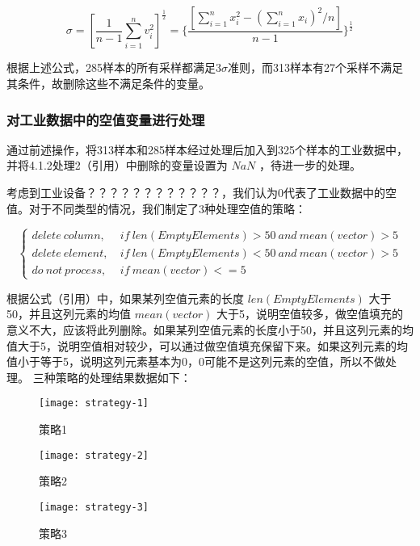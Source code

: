 \documentclass[bwprint]{gmcmthesis}
\begin{document}
\begin{equation}\label{eq:3sigma}
	\sigma = [\frac{1}{n-1}\sum_{i=1}^{n}v_i^2]^{\frac{1}{2}} = \{\frac{[\sum^n_{i=1}x_i^2 - (\sum^n_{i=1}x_i)^2/n]}{n-1}\}^{\frac{1}{2}}
\end{equation}

根据上述公式，285样本的所有采样都满足3$\sigma$准则，而313样本有27个采样不满足其条件，故删除这些不满足条件的变量。


\FloatBarrier
\subsubsection{对工业数据中的空值变量进行处理}

通过前述操作，将313样本和285样本经过处理后加入到325个样本的工业数据中，并将4.1.2处理2（引用）中删除的变量设置为 $NaN$ ，待进一步的处理。

考虑到工业设备？？？？？？？？？？？？，我们认为0代表了工业数据中的空值。对于不同类型的情况，我们制定了3种处理空值的策略：

\begin{equation}\label{eq:empty-strategies}
\left\{
\begin{aligned}
delete \ column, \ & if \ len(EmptyElements)>50 \ and \ mean(vector)>5 \\  
delete \ element, \ & if \ len(EmptyElements)<50 \ and \ mean(vector)>5\\  
do \ not \ process, \ & if \ mean(vector)<=5
\end{aligned}
\right.
\end{equation}

根据公式（引用）中，如果某列空值元素的长度 $len(EmptyElements)$ 大于50，并且这列元素的均值 $ mean(vector)$ 大于5，说明空值较多，做空值填充的意义不大，应该将此列删除。如果某列空值元素的长度小于50，并且这列元素的均值大于5，说明空值相对较少，可以通过做空值填充保留下来。如果这列元素的均值小于等于5，说明这列元素基本为0，0可能不是这列元素的空值，所以不做处理。
三种策略的处理结果数据如下：

\begin{figure}[htb]
	\centering
	\texttt{[image: strategy-1]}
	\caption{策略1}
\end{figure}


\begin{figure}[htb]
	\centering
	\texttt{[image: strategy-2]}
	\caption{策略2}
\end{figure}


\begin{figure}[htb]
	\centering
	\texttt{[image: strategy-3]}
	\caption{策略3}
\end{figure}
\end{document}
